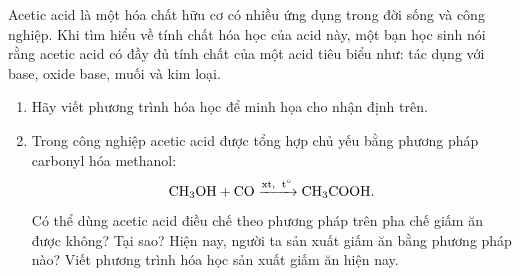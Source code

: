 \begin{tuluyen}
Acetic acid là một hóa chất hữu cơ có nhiều ứng dụng trong đời sống và công nghiệp. Khi tìm hiểu về tính chất hóa học của acid này, một bạn học sinh nói rằng acetic acid có đầy đủ tính chất của một acid tiêu biểu như: tác dụng với base, oxide base, muối và kim loại.
\begin{enumerate}
\item Hãy viết phương trình hóa học để minh họa cho nhận định trên.
\item Trong công nghiệp acetic acid được tổng hợp chủ yếu bằng phương pháp carbonyl hóa methanol:
\[
\ce{CH3OH + CO ->[xt,\ t^\circ] CH3COOH}.
\]
Có thể dùng acetic acid điều chế theo phương pháp trên pha chế giấm ăn được không? Tại sao? Hiện nay, người ta sản xuất giấm ăn bằng phương pháp nào? Viết phương trình hóa học sản xuất giấm ăn hiện nay.
\end{enumerate}
\end{tuluyen}




